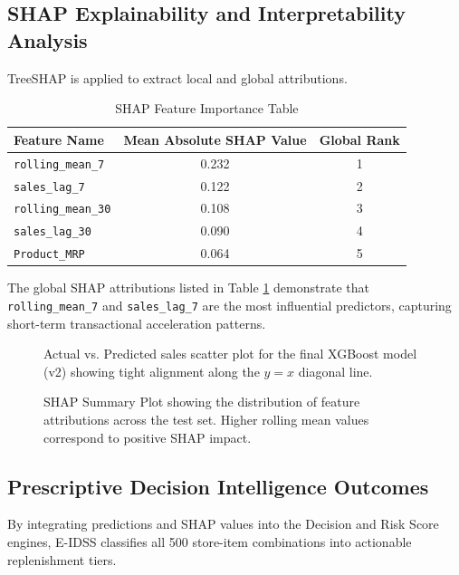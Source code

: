 \documentclass[conference]{IEEEtran}
\begin{document}
\subsection{SHAP Explainability and Interpretability Analysis}
TreeSHAP is applied to extract local and global attributions.

\begin{table}[htbp]
\caption{SHAP Feature Importance Table}
\label{tab:shap_importance}
\centering
\begin{tabular}{lcc}
\toprule
\textbf{Feature Name} & \textbf{Mean Absolute SHAP Value} & \textbf{Global Rank} \\
\midrule
\texttt{rolling\_mean\_7} & 0.232 & 1 \\
\texttt{sales\_lag\_7} & 0.122 & 2 \\
\texttt{rolling\_mean\_30} & 0.108 & 3 \\
\texttt{sales\_lag\_30} & 0.090 & 4 \\
\texttt{Product\_MRP} & 0.064 & 5 \\
\bottomrule
\end{tabular}
\end{table}

The global SHAP attributions listed in Table \ref{tab:shap_importance} demonstrate that \texttt{rolling\_mean\_7} and \texttt{sales\_lag\_7} are the most influential predictors, capturing short-term transactional acceleration patterns.

\begin{figure}[htbp]
\centering
{}
\caption{Actual vs. Predicted sales scatter plot for the final XGBoost model (v2) showing tight alignment along the $y=x$ diagonal line.}
\label{fig:act_vs_pred}
\end{figure}

\begin{figure}[htbp]
\centering
{}
\caption{SHAP Summary Plot showing the distribution of feature attributions across the test set. Higher rolling mean values correspond to positive SHAP impact.}
\label{fig:shap_summary}
\end{figure}

\subsection{Prescriptive Decision Intelligence Outcomes}
By integrating predictions and SHAP values into the Decision and Risk Score engines, E-IDSS classifies all 500 store-item combinations into actionable replenishment tiers.
\end{document}
